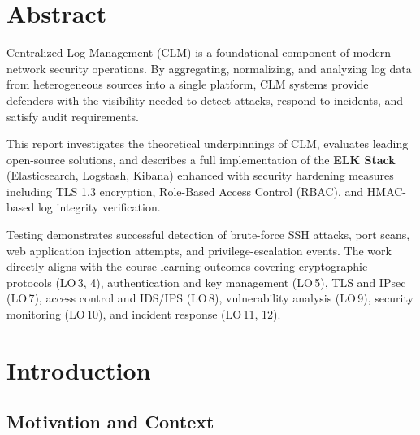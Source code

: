 \documentclass[12pt,a4paper]{report}
\begin{document}
\newpage
\chapter*{Abstract}

Centralized Log Management (CLM) is a foundational component of modern network security operations.
By aggregating, normalizing, and analyzing log data from heterogeneous sources into a single
platform, CLM systems provide defenders with the visibility needed to detect attacks, respond to
incidents, and satisfy audit requirements.

This report investigates the theoretical underpinnings of CLM, evaluates leading open-source
solutions, and describes a full implementation of the \textbf{ELK Stack} (Elasticsearch,
Logstash, Kibana) enhanced with security hardening measures including TLS 1.3 encryption,
Role-Based Access Control (RBAC), and HMAC-based log integrity verification.

Testing demonstrates successful detection of brute-force SSH attacks, port scans, web
application injection attempts, and privilege-escalation events.
The work directly aligns with the course learning outcomes covering cryptographic protocols
(LO\,3, 4), authentication and key management (LO\,5), TLS and IPsec (LO\,7), access control and
IDS/IPS (LO\,8), vulnerability analysis (LO\,9), security monitoring (LO\,10), and incident
response (LO\,11, 12).


\newpage
\tableofcontents

\newpage
\listoffigures

\newpage
\listoftables

\newpage
\chapter{Introduction}

\section{Motivation and Context}
\end{document}
